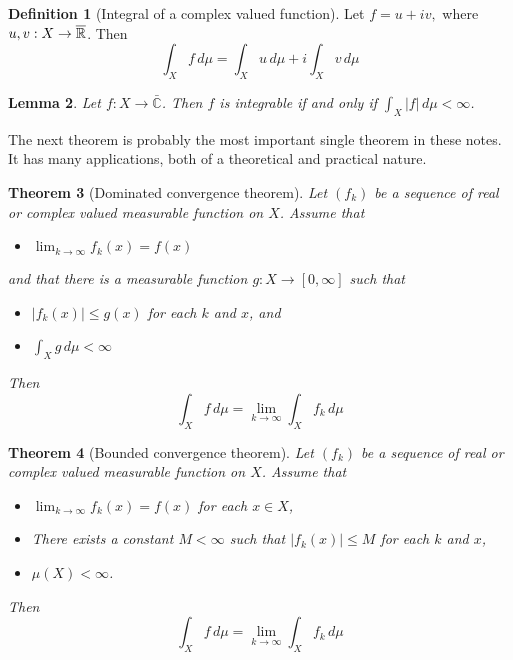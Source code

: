 \documentclass[10pt, oneside, reqno]{amsart}
\theoremstyle{plain}%
\newtheorem{thm}{Theorem}[section]
\newtheorem{lem}[thm]{Lemma}
\theoremstyle{definition}
\newtheorem{defn}[thm]{Definition}
\theoremstyle{remark}
\newcommand{\dmu}{\, d \mu}
\begin{document}
\begin{defn}[Integral of a complex valued function]
    Let $f = u + iv,$ where $u,v : X \rightarrow \overline{\mathbb{R}}$.  Then \[
        \int_X f \dmu = \int_X u \dmu + i \int_X v \dmu
    \]
\end{defn}
\begin{lem}
    Let $f : X \rightarrow \bar{\mathbb{C}}$.  Then $f$ is integrable if and only if $\int_X |f| \dmu < \infty$.
\end{lem}


The next theorem is probably the most important single theorem in these notes.  It has many applications, both of a theoretical and practical nature.
\begin{thm}[Dominated convergence theorem]
    Let $(f_k)$ be a sequence of real or complex valued measurable function on $X$. Assume that \begin{itemize}
        \item $\lim_{k \rightarrow \infty} f_k(x) = f(x)$
    \end{itemize}
    and that there is a measurable function $g: X \rightarrow [0,\infty]$ such that 
    \begin{itemize}
        \item $|f_k(x)| \leq g(x)$ for each $k$ and $x$, and 
    \end{itemize}
    
    \begin{itemize}
        \item $\int_X g \dmu < \infty$
    \end{itemize}
    Then \[
        \int_X f \dmu = \lim_{k \rightarrow \infty} \int_X f_k \dmu
    \]
\end{thm}



\begin{thm}[Bounded convergence theorem]
    Let $(f_k)$ be a sequence of real or complex valued measurable function on $X$.  Assume that \begin{itemize}
        \item $\lim_{k \rightarrow \infty} f_k(x) = f(x)$ for each $x \in X$,
        \item There exists a constant $M < \infty$ such that $|f_k(x)| \leq M$ for each $k$ and $x$,
        \item $\mu(X) < \infty$.
    \end{itemize}
    Then \[
        \int_X f \dmu = \lim_{k \rightarrow \infty} \int_X f_k \dmu
    \]
    \end{thm}
\end{document}
